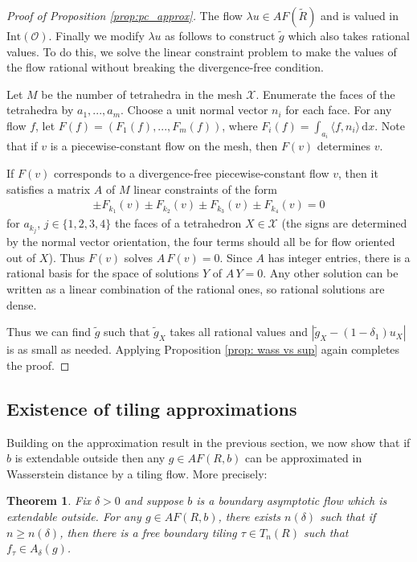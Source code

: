 \documentclass[11pt]{article}
\newtheorem{thm}{Theorem}[subsection]
\theoremstyle{remark}
\theoremstyle{definition}
\newcommand{\mc}[1]{\mathcal{#1}}
\newcommand{\dd}{\mathrm{d}}
\begin{document}
\begin{proof}[Proof of Proposition \ref{prop:pc_approx}]
    The flow $\lambda u\in AF(\widetilde R)$ and is valued in $\text{Int}(\mc O)$. Finally we modify $\lambda u$ as follows to construct $\widetilde g$ which also takes rational values. To do this, we solve the linear constraint problem to make the values of the flow rational without breaking the divergence-free condition.
        
        Let $M$ be the number of tetrahedra in the mesh $\mc X$. Enumerate the faces of the tetrahedra by $a_1,...,a_m$. Choose a unit normal vector $n_i$ for each face. For any flow $f$, let $F(f) = (F_1(f),...,F_m(f))$, where $F_i(f) = \int_{a_i} \langle f, n_i\rangle \, \dd x$. Note that if $v$ is a piecewise-constant flow on the mesh, then $F(v)$ determines $v$. 
        
        If $F(v)$ corresponds to a divergence-free piecewise-constant flow $v$, then it satisfies a matrix $A$ of $M$ linear constraints of the form
\begin{align*}
    \pm F_{k_1}(v)\pm F_{k_2}(v)\pm F_{k_3}(v)\pm F_{k_4}(v) = 0
\end{align*}
for $a_{k_j}$, $j\in \{1,2,3,4\}$ the faces of a tetrahedron $X\in \mc X$ (the signs are determined by the normal vector orientation, the four terms should all be for flow oriented out of $X$). Thus $F(v)$ solves $A \,F(v) = 0$. Since $A$ has integer entries, there is a rational basis for the space of solutions $Y$ of $A \, Y = 0$. Any other solution can be written as a linear combination of the rational ones, so rational solutions are dense. 

Thus we can find $\widetilde g$ such that $\widetilde g_X$ takes all rational values and $|\widetilde g_X - (1-\delta_1)u_X|$ is as small as needed. Applying Proposition \ref{prop: wass vs sup} again completes the proof. 
\end{proof}

\subsection{Existence of tiling approximations}\label{sec: shining light}

Building on the approximation result in the previous section, we now show that if $b$ is extendable outside then any ${g}\in AF(R,b)$ can be approximated in Wasserstein distance by a tiling flow. More precisely:
\begin{thm}\label{thm:shininglight}
Fix $\delta>0$ and suppose $b$ is a boundary asymptotic flow which is extendable outside. For any ${g}\in AF(R,b)$, there exists $n(\delta)$ such that if $n\geq n(\delta)$, then there is a free boundary tiling $\tau\in T_n(R)$ such that $f_\tau\in A_\delta(g)$.
\end{thm}
\end{document}
